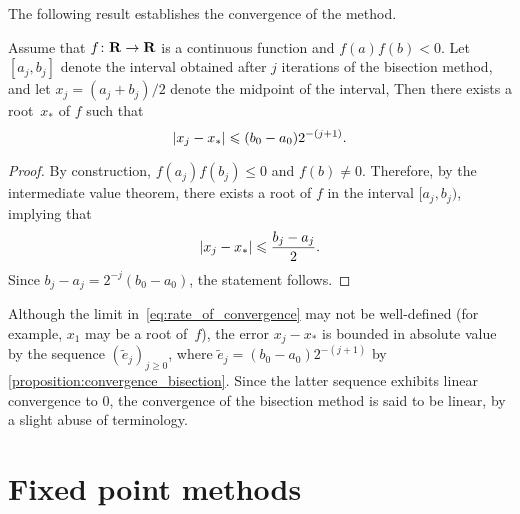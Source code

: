 The following result establishes the convergence of the method.
\begin{proposition}
    \label{proposition:convergence_bisection}
    Assume that $f\colon \mathbf R \to \mathbf R$ is a continuous function and $f(a) f(b) < 0$.
    Let~$[a_j, b_j]$ denote the interval obtained after $j$ iterations of the bisection method,
    and let $x_j = (a_j + b_j)/2$ denote the midpoint of the interval,
    Then there exists a root~$x_*$ of $f$ such that
    \begin{equation}
        \label{eq:error_bisection}
        \lvert x_j - x_*\rvert \leqslant (b_0 - a_0) 2^{-(j+1)}.
    \end{equation}
\end{proposition}
\begin{proof}
    By construction, $f(a_j) f(b_j) \leq 0$ and $f(b) \neq 0$.
    Therefore, by the intermediate value theorem,
    there exists a root of $f$ in the interval $[a_j, b_j)$,
    implying that
    \[
        \lvert x_j - x_*\rvert \leqslant \frac{b_j - a_j}{2}.
    \]
    Since $b_j - a_j = 2^{-j} (b_0 - a_0)$,
    the statement follows.
\end{proof}
Although the limit in~\eqref{eq:rate_of_convergence} may not be well-defined (for example, $x_1$ may be a root of~$f$),
the error $x_j - x_*$ is bounded in absolute value by the sequence $(\widetilde e_j)_{j \geq 0}$,
where $\widetilde e_j = (b_0 - a_0) 2^{-(j+1)}$ by \cref{proposition:convergence_bisection}.
Since the latter sequence exhibits linear convergence to 0,
the convergence of the bisection method is said to be linear,
by a slight abuse of terminology.


\section{Fixed point methods}
\label{sec:fixed_point_methods}

